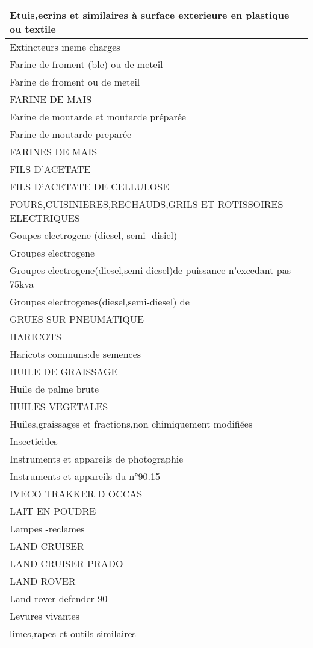 \documentclass[
]{book}
\begin{document}
\begin{table}
\begin{tabular}[t]{l}
\hline
Etuis,ecrins et similaires à surface exterieure en plastique ou textile\\
\hline
Extincteurs meme charges\\
\hline
Farine de froment (ble) ou de meteil\\
\hline
Farine de froment ou de meteil\\
\hline
FARINE DE MAIS\\
\hline
Farine de moutarde et moutarde préparée\\
\hline
Farine de moutarde preparée\\
\hline
FARINES DE MAIS\\
\hline
FILS D'ACETATE\\
\hline
FILS D'ACETATE DE CELLULOSE\\
\hline
FOURS,CUISINIERES,RECHAUDS,GRILS ET ROTISSOIRES  ELECTRIQUES\\
\hline
Goupes electrogene (diesel, semi- disiel)\\
\hline
Groupes electrogene\\
\hline
Groupes electrogene(diesel,semi-diesel)de puissance n'excedant pas 75kva\\
\hline
Groupes electrogenes(diesel,semi-diesel) de\\
\hline
GRUES SUR PNEUMATIQUE\\
\hline
HARICOTS\\
\hline
Haricots communs:de semences\\
\hline
HUILE DE GRAISSAGE\\
\hline
Huile de palme brute\\
\hline
HUILES VEGETALES\\
\hline
Huiles,graissages et fractions,non chimiquement modifiées\\
\hline
Insecticides\\
\hline
Instruments et appareils de photographie\\
\hline
Instruments et appareils du n°90.15\\
\hline
IVECO TRAKKER D OCCAS\\
\hline
LAIT EN POUDRE\\
\hline
Lampes -reclames\\
\hline
LAND CRUISER\\
\hline
LAND CRUISER PRADO\\
\hline
LAND ROVER\\
\hline
Land rover defender 90\\
\hline
Levures vivantes\\
\hline
limes,rapes et outils similaires\\

\end{tabular}
\end{table}
\end{document}
